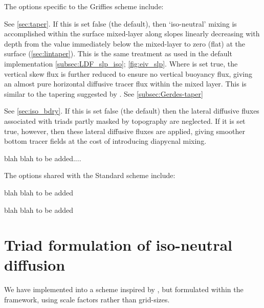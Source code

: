 \documentclass[../tex_main/NEMO_manual]{subfiles}
\begin{document}
The options specific to the Griffies scheme include:
\begin{description}[font=\normalfont]
\item[\np{ln\_triad\_iso}]
  See \autoref{sec:taper}.
  If this is set false (the default),
  then `iso-neutral' mixing is accomplished within the surface mixed-layer along slopes linearly decreasing with
  depth from the value immediately below the mixed-layer to zero (flat) at the surface (\autoref{sec:lintaper}).
  This is the same treatment as used in the default implementation
  \autoref{subsec:LDF_slp_iso}; \autoref{fig:eiv_slp}.
  Where  is set true,
  the vertical skew flux is further reduced to ensure no vertical buoyancy flux,
  giving an almost pure horizontal diffusive tracer flux within the mixed layer.
  This is similar to the tapering suggested by \citet{Gerdes1991}. See \autoref{subsec:Gerdes-taper}
\item[\np{ln\_botmix\_triad}]
  See \autoref{sec:iso_bdry}. 
  If this is set false (the default) then the lateral diffusive fluxes
  associated with triads partly masked by topography are neglected. 
  If it is set true, however, then these lateral diffusive fluxes are applied, 
  giving smoother bottom tracer fields at the cost of introducing diapycnal mixing.
\item[\np{rn\_sw\_triad}]
  blah blah to be added....
\end{description}
The options shared with the Standard scheme include:
\begin{description}[font=\normalfont]
\item[\np{ln\_traldf\_msc}]   blah blah to be added
\item[\np{rn\_slpmax}]  blah blah to be added
\end{description}

\section{Triad formulation of iso-neutral diffusion}
\label{sec:iso}
We have implemented into \NEMO a scheme inspired by \citet{Griffies_al_JPO98},
but formulated within the \NEMO framework, using scale factors rather than grid-sizes.
\end{document}
